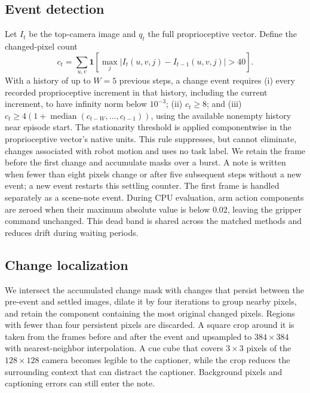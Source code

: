 \documentclass{IJCAS}
\begin{document}
\subsection{Event detection}
Let $I_t$ be the top-camera image and $q_t$ the full proprioceptive vector. Define the changed-pixel count
\begin{equation}
c_t=\sum_{u,v}\mathbf{1}\!\left[\max_j|I_t(u,v,j)-I_{t-1}(u,v,j)|>40\right].
\end{equation}
With a history of up to $W=5$ previous steps, a change event requires (i) every recorded proprioceptive increment in that history, including the current increment, to have infinity norm below $10^{-3}$; (ii) $c_t\geq8$; and (iii) $c_t\geq4(1+\operatorname{median}(c_{t-W},\ldots,c_{t-1}))$, using the available nonempty history near episode start.
The stationarity threshold is applied componentwise in the proprioceptive vector's native units.
This rule suppresses, but cannot eliminate, changes associated with robot motion and uses no task label.
We retain the frame before the first change and accumulate masks over a burst.
A note is written when fewer than eight pixels change or after five subsequent steps without a new event; a new event restarts this settling counter.
The first frame is handled separately as a scene-note event.
During CPU evaluation, arm action components are zeroed when their maximum absolute value is below 0.02, leaving the gripper command unchanged. This dead band is shared across the matched methods and reduces drift during waiting periods.

\subsection{Change localization}
We intersect the accumulated change mask with changes that persist between the pre-event and settled images, dilate it by four iterations to group nearby pixels, and retain the component containing the most original changed pixels. Regions with fewer than four persistent pixels are discarded. A square crop around it is taken from the frames before and after the event and upsampled to $384\times384$ with nearest-neighbor interpolation. A cue cube that covers $3\times3$ pixels of the $128\times128$ camera becomes legible to the captioner, while the crop reduces the surrounding context that can distract the captioner. Background pixels and captioning errors can still enter the note.
\end{document}
